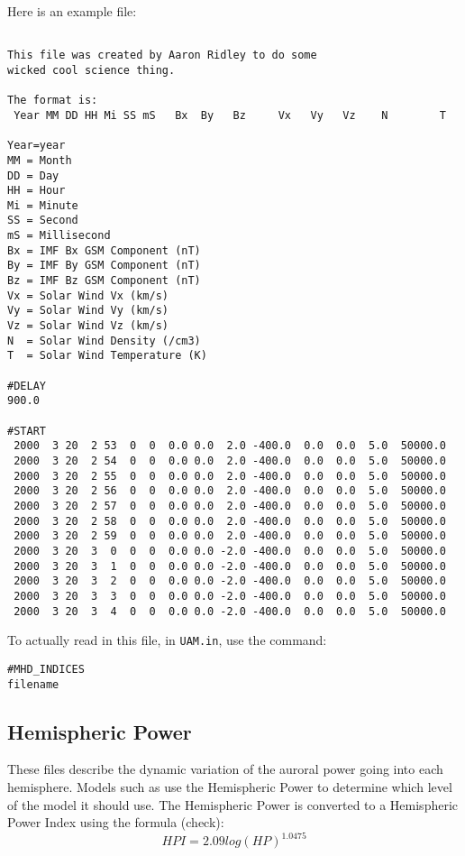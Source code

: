 Here is an example file:
\begin{verbatim}

This file was created by Aaron Ridley to do some
wicked cool science thing.

The format is:
 Year MM DD HH Mi SS mS   Bx  By   Bz     Vx   Vy   Vz    N        T

Year=year
MM = Month
DD = Day
HH = Hour
Mi = Minute
SS = Second
mS = Millisecond
Bx = IMF Bx GSM Component (nT)
By = IMF By GSM Component (nT)
Bz = IMF Bz GSM Component (nT)
Vx = Solar Wind Vx (km/s)
Vy = Solar Wind Vy (km/s)
Vz = Solar Wind Vz (km/s)
N  = Solar Wind Density (/cm3)
T  = Solar Wind Temperature (K)

#DELAY
900.0

#START
 2000  3 20  2 53  0  0  0.0 0.0  2.0 -400.0  0.0  0.0  5.0  50000.0
 2000  3 20  2 54  0  0  0.0 0.0  2.0 -400.0  0.0  0.0  5.0  50000.0
 2000  3 20  2 55  0  0  0.0 0.0  2.0 -400.0  0.0  0.0  5.0  50000.0
 2000  3 20  2 56  0  0  0.0 0.0  2.0 -400.0  0.0  0.0  5.0  50000.0
 2000  3 20  2 57  0  0  0.0 0.0  2.0 -400.0  0.0  0.0  5.0  50000.0
 2000  3 20  2 58  0  0  0.0 0.0  2.0 -400.0  0.0  0.0  5.0  50000.0
 2000  3 20  2 59  0  0  0.0 0.0  2.0 -400.0  0.0  0.0  5.0  50000.0
 2000  3 20  3  0  0  0  0.0 0.0 -2.0 -400.0  0.0  0.0  5.0  50000.0
 2000  3 20  3  1  0  0  0.0 0.0 -2.0 -400.0  0.0  0.0  5.0  50000.0
 2000  3 20  3  2  0  0  0.0 0.0 -2.0 -400.0  0.0  0.0  5.0  50000.0
 2000  3 20  3  3  0  0  0.0 0.0 -2.0 -400.0  0.0  0.0  5.0  50000.0
 2000  3 20  3  4  0  0  0.0 0.0 -2.0 -400.0  0.0  0.0  5.0  50000.0
\end{verbatim}


To actually read in this file, in {\tt UAM.in}, use the command:

\begin{verbatim}
#MHD_INDICES
filename
\end{verbatim}

\subsection{Hemispheric Power}

These files describe the dynamic variation of the auroral power going
into each hemisphere.  Models such as \cite{fuller87} use the
Hemispheric Power to determine which level of the model it should use.
The Hemispheric Power is converted to a Hemispheric Power Index using the 
formula (check):
\begin{equation}
HPI = 2.09log(HP)^{1.0475}
\end{equation}

